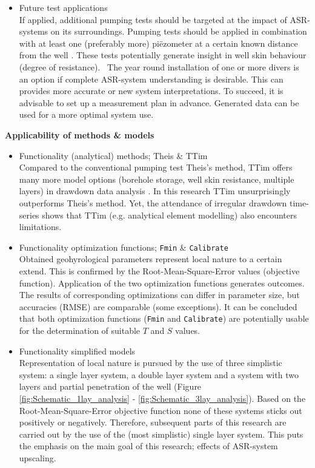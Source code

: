 \begin{itemize}
\item Future test applications \\
If applied, additional pumping tests should be targeted at the impact of ASR-systems on its surroundings. Pumping tests should be applied in combination with at least one (preferably more) piëzometer at a certain known distance from the well \citep{Kruseman2000}. These tests potentially generate insight in well skin behaviour (degree of resistance). \
The year round installation of one or more divers is an option if complete ASR-system understanding is desirable. This can provides more accurate or new system interpretations. To succeed, it is advisable to set up a measurement plan in advance. Generated data can be used for a more optimal system use.  
\end{itemize}

\textbf{Applicability of methods \& models}
\begin{itemize}
\item Functionality (analytical) methods; Theis \& TTim \\
Compared to the conventional pumping test Theis's method, TTim offers many more model options (borehole storage, well skin resistance, multiple layers) in drawdown data analysis \citep{Mishra2013,Bakker2013}. In this research TTim unsurprisingly outperforms Theis's method. Yet, the attendance of irregular drawdown time-series shows that TTim (e.g. analytical element modelling) also encounters limitations. 

\item Functionality optimization functions; \texttt{Fmin} \& \texttt{Calibrate} \\
Obtained geohyrological parameters represent local nature to a certain extend. This is confirmed by the Root-Mean-Square-Error values (objective function). Application of the two optimization functions generates outcomes. The results of corresponding optimizations can differ in parameter size, but accuracies (RMSE) are comparable (some exceptions). It can be concluded that both optimization functions (\texttt{Fmin} and \texttt{Calibrate}) are potentially usable for the determination of suitable $T$ and $S$ values. 

\item Functionality simplified models  \\
Representation of local nature is pursued by the use of three simplistic system: a single layer system, a double layer system and a system with two layers and partial penetration of the well (Figure \ref{fig:Schematic_1lay_analysis} - \ref{fig:Schematic_3lay_analysis}). Based on the Root-Mean-Square-Error objective function none of these systems sticks out positively or negatively. Therefore, subsequent parts of this research are carried out by the use of the (most simplistic) single layer system. This puts the emphasis on the main goal of this research; effects of ASR-system upscaling.  
\end{itemize}

